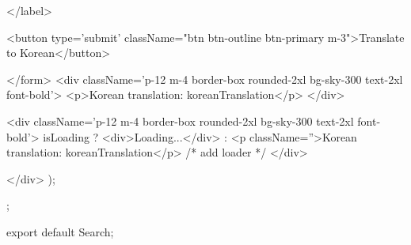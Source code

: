 {        </label>

        <button type='submit' className="btn btn-outline  btn-primary m-3">Translate to Korean</button>

      </form>
      <div className='p-12 m-4 border-box rounded-2xl  bg-sky-300 text-2xl font-bold'>
         <p>Korean translation: {koreanTranslation}</p>
      </div>

      <div className='p-12 m-4 border-box rounded-2xl  bg-sky-300 text-2xl font-bold'>
      {isLoading ? <div>Loading...</div> : <p className=''>Korean translation: {koreanTranslation}</p>} {/* add loader */}
    </div>



    </div>
  );
};

export default Search;

